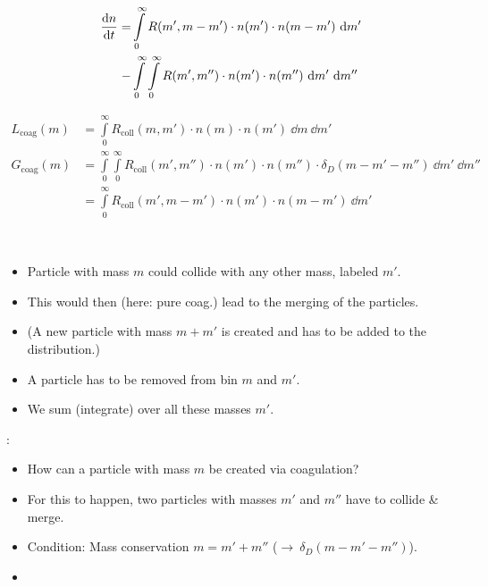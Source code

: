     \begin{align}
        \frac{\text{d} n}{\text{d} t}
        = 
            &\int\limits_0^\infty R(m',m-m') \cdot n(m') \cdot n(m-m') \ \text dm' \\
            -&\int\limits_0^\infty \int\limits_0^\infty R(m',m'')
            \cdot n(m') \cdot n(m'') \ \text dm' \ \text dm'' 
    \end{align}






    \clearpage 

    \begin{align}
        L_\text{coag}(m)
            &= \int\limits_0^\infty R_\text{coll}(m, m') \cdot n(m) \cdot n(m') \ \dd m \ \dd m' \\
        G_\text{coag}(m)
            &= \int\limits_0^\infty \int\limits_0^\infty R_\text{coll}(m', m'') \cdot
                n(m') \cdot n(m'') \cdot \delta_D(m-m'-m'') \ \dd m' \ \dd m'' \\
            &= \int\limits_0^\infty R_\text{coll}(m', m-m') \cdot n(m') \cdot n(m-m') \ \dd m'
    \end{align}

     \\

    \begin{itemize}
        \item Particle with mass $m$ could collide with any other mass, labeled $m'$.
        \item This would then (here: pure coag.) lead to the merging of the particles.
        \item (A new particle with mass $m+m'$ is created and has to be added to the distribution.)
        \item A particle has to be removed from bin $m$ and $m'$.
        \item We sum (integrate) over all these masses $m'$.
    \end{itemize}

    :
    \begin{itemize}
        \item How can a particle with mass $m$ be created via coagulation?
        \item For this to happen, two particles with masses $m'$ and $m''$ have to collide \& merge.
        \item Condition: Mass conservation $m=m'+m''$ ($\to\ \delta_D(m-m'-m'')$).
        \item 
    \end{itemize}

